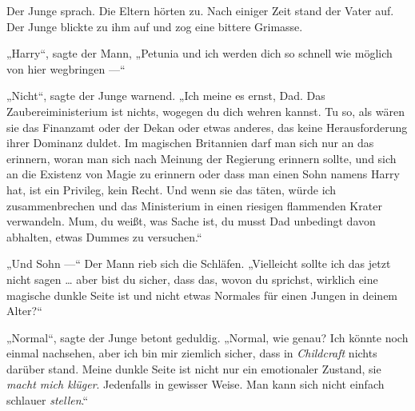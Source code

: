 


Der Junge sprach. Die Eltern hörten zu. Nach einiger Zeit stand der Vater auf. Der Junge blickte zu ihm auf und zog eine bittere Grimasse.

„Harry“, sagte der Mann,
„Petunia und ich werden dich so schnell wie möglich von hier wegbringen —“

„Nicht“, sagte der Junge warnend.
„Ich meine es ernst, Dad. Das Zaubereiministerium ist nichts, wogegen du dich wehren kannst. Tu so, als wären sie das Finanzamt oder der Dekan oder etwas anderes, das keine Herausforderung ihrer Dominanz duldet. Im magischen Britannien darf man sich nur an das erinnern, woran man sich nach Meinung der Regierung erinnern sollte, und sich an die Existenz von Magie zu erinnern oder dass man einen Sohn namens Harry hat, ist ein Privileg, kein Recht. Und wenn sie das täten, würde ich zusammenbrechen und das Ministerium in einen riesigen flammenden Krater verwandeln. Mum, du weißt, was Sache ist, du musst Dad unbedingt davon abhalten, etwas Dummes zu versuchen.“

„Und Sohn —“ Der Mann rieb sich die Schläfen.
„Vielleicht sollte ich das jetzt nicht sagen … aber bist du sicher, dass das, wovon du sprichst, wirklich eine magische dunkle Seite ist und nicht etwas Normales für einen Jungen in deinem Alter?“

„Normal“, sagte der Junge betont geduldig.
„Normal, wie genau? Ich könnte noch einmal nachsehen, aber ich bin mir ziemlich sicher, dass in \emph{Childcraft} nichts darüber stand. Meine dunkle Seite ist nicht nur ein emotionaler Zustand, sie \emph{macht mich klüger}. Jedenfalls in gewisser Weise. Man kann sich nicht einfach schlauer \emph{stellen}.“

